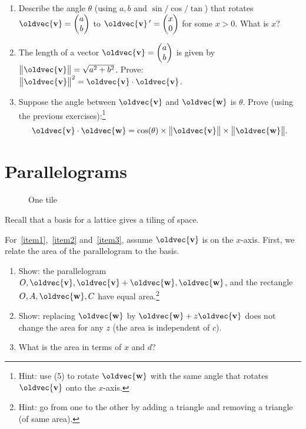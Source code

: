 \documentclass[10pt,a4paper]{article}
\newcommand{\twovec}[2]{\ensuremath{\begin{pmatrix}{#1}\\{#2}\end{pmatrix}}}
\renewcommand{\vec}[1]{\oldvec{\mathbf{#1}}}
\DeclarePairedDelimiter{\norm}{\big\lVert}{\big\rVert}
\begin{document}
\begin{enumerate}
	\begin{figure}[h!]
		\centering{}
	\end{figure}
\item Describe the angle \(\theta\) (using \(a, b\) and \(\sin/\cos/\tan\)) that rotates \(\vec{v} = \twovec{a}{b}\) to \(\vec{v}\,' = \twovec{x}{0}\) for some \(x > 0\).
	What is \(x\)?

\item The length of a vector \(\vec{v} = \twovec{a}{b}\) is given by \(\norm{\vec{v}} = \sqrt{a^2 + b^2}\).
	Prove: \(\norm{\vec{v}}^2 = \vec{v} \cdot \vec{v}\).

\item Suppose the angle between \(\vec{v}\) and \(\vec{w}\) is \(\theta\).
	Prove (using the previous exercises):\footnote{Hint: use (5) to rotate \(\vec{w}\) with the same angle that rotates \(\vec{v}\) onto the \(x\)-axis.}
	\[\vec{v} \cdot \vec{w} = \cos(\theta) \times \norm{\vec{v}} \times \norm{\vec{w}}.\]
\end{enumerate}

\clearpage
\section{Parallelograms}
\begin{wrapfigure}[5]{r}[1em]{.3\textwidth}
		\vspace*{-3em}
		\caption{One tile}
\end{wrapfigure}

Recall that a basis for a lattice gives a tiling of space.

For~\ref{item1},~\ref{item2} and~\ref{item3}, assume \(\vec{v}\) is on the \(x\)-axis.
First, we relate the area of the parallelogram to the basis.
\begin{enumerate}
	\item\label{item1} Show: the parallelogram \(O, \vec{v}, \vec{v}+\vec{w}, \vec{w}\), and the rectangle \(O, A, \vec{w}, C\) have equal
		area.\footnote{Hint: go from one to the other by adding a triangle and removing a triangle (of same area).}
	\item\label{item2} Show:
		replacing \(\vec{w}\) by \(\vec{w} + z \vec{v}\) does not change the area for any \(z\)
		(the area is independent of \(c\)).
	\item\label{item3} What is the area in terms of \(x\) and \(d\)?
\end{enumerate}
\end{document}
